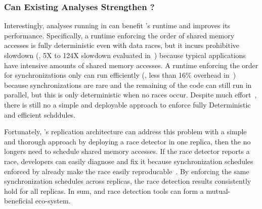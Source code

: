 \subsubsection{Can Existing Analyses Strengthen \xxx?} 
\label{sec:strengthen-crane}

Interestingly, analyses running in \xxx can benefit \xxx's \dmt runtime and 
improves its performance. Specifically, a \dmt runtime enforcing the order of 
shared memory accesses is fully deterministic even with data races, but it 
incurs prohibitive slowdown (\eg, 5X to 124X slowdown evaluated 
in~\cite{parrot:sosp13}) because typical applications have intensive amounts of 
shared memory accesses. A \dmt runtime enforcing the order for synchronizations 
only can run efficiently (\eg, less than 16\% overhead in~\cite{kendo:asplos09, 
tern:osdi10, parrot:sosp13}) because synchronizations are rare and the 
remaining of the code can still run in parallel, but this \dmt is only 
deterministic when no races occur. Despite much effort~\cite{dthreads:sosp11, 
peregrine:sosp11, determinator:osdi10}, there is still no a simple and 
deployable approach to enforce fully Deterministic and efficient \dmt schddules.

Fortunately, \xxx's replication architecture can address this problem with a 
simple and thorough approach by deploying a race detector in one replica, then 
the \dmt no longers need to schedule shared memory accesses. If the race 
detector reports a race, developers can easily diagnose and fix it because 
synchronization schedules enforced by \dmt already make the race easily 
reproducable~\cite{pres:sosp09}. By enforcing the same synchronization 
schedules across replicas, the race detection results consistently hold for all 
replicas. In sum, \xxx and race detection tools can form a mutual-beneficial 
eco-system.

